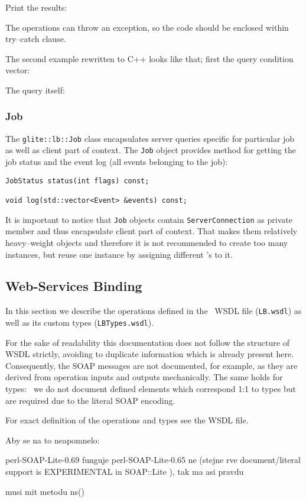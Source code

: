 Print the results:


The operations can throw an exception, so the code should be enclosed
within try--catch clause.

The second example rewritten to C++ looks like that; first the query
condition vector:


The query itself:


\subsubsection{Job}
The \verb'glite::lb::Job' class encapsulates \LB server queries
specific for particular job as well as client part of context. The
\verb'Job' object provides method for getting the job status and the
event log (\ie all events belonging to the job):
\begin{lstlisting}
JobStatus status(int flags) const;

void log(std::vector<Event> &events) const;
\end{lstlisting}

%
It is important to notice that \verb'Job' objects contain
\verb'ServerConnection' as private member and thus encapsulate client
part of context. That makes them relatively heavy--weight objects and
therefore it is not recommended to create too many instances, but
reuse one instance by assigning different \jobid's to it.


\subsection{Web-Services Binding}\label{s:Consumer-API-WS}


In this section we describe the operations defined in the \LB\ WSDL
file (\texttt{LB.wsdl}) as well as its custom types (\texttt{LBTypes.wsdl}).

For the sake of readability this documentation does not follow the structure
of WSDL strictly, avoiding to duplicate information which is already present
here. Consequently, the SOAP messages are not documented, for example, as they
are derived from operation inputs and outputs mechanically.
The same holds for types: \eg\ we do not document defined elements
which correspond 1:1 to types but are required due to the literal SOAP
encoding.

For exact definition of the operations and types see the WSDL file.



Aby se na to neapomnelo:

perl-SOAP-Lite-0.69 funguje
perl-SOAP-Lite-0.65 ne 	(stejne rve document/literal support is EXPERIMENTAL in SOAP::Lite ), tak ma asi pravdu


musi mit metodu ns()

